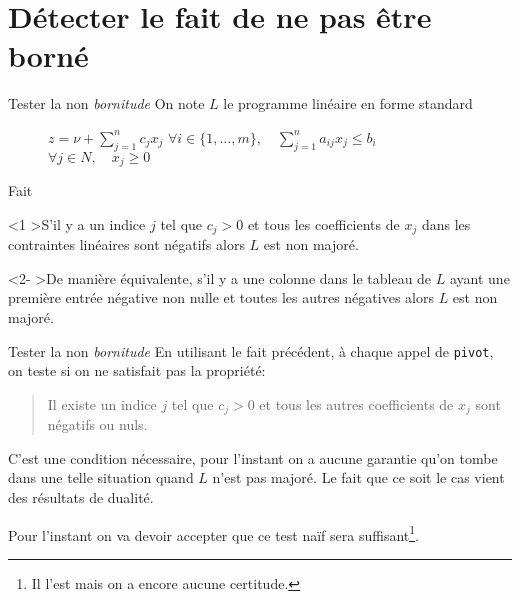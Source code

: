 \documentclass[aspectratio = 169]{beamer}
\begin{document}
\section{Détecter le fait de ne pas être borné}

\begin{frame}{Tester la non \emph{bornitude}}
  On note $L$ le programme linéaire en forme standard
  \begin{figure}
    \begin{linearProgG}{
        ${\displaystyle z = \nu + \sum_{j=1}^n c_jx_j}$
      }{
        ${\displaystyle \forall i \in \{1, \ldots, m\}, \quad \sum_{j=1}^n a_{ij}x_j \leq b_i}$
      }{
        $\forall j \in N, \quad x_j \geq 0$
      }
    \end{linearProgG}
  \end{figure}
  \begin{halfshyblock}{Fait}
    \begin{onlyenv}<1
      >S'il y a un indice $j$ tel que $c_j > 0$ et
      tous les coefficients de $x_j$ dans les contraintes linéaires
      sont négatifs alors $L$ est non majoré.
    \end{onlyenv}
    \begin{onlyenv}<2-
      >\!\alert{De manière équivalente, s'il y a une
        colonne dans le tableau de $L$ ayant une première entrée
        négative non nulle et toutes les autres négatives alors $L$
        est non majoré.}
    \end{onlyenv}
    \end{halfshyblock}
\end{frame}

\begin{frame}{Tester la non \emph{bornitude}}
  En utilisant le fait précédent, à chaque appel de
  \texttt{pivot}, on teste si on ne satisfait pas la
  propriété:
  \begin{quote}
    Il existe un indice $j$ tel que $c_j > 0$ et tous les autres
    coefficients de $x_j$ sont négatifs ou nuls.
    \end{quote}
    \pause
    C'est une condition nécessaire, pour l'instant on a aucune
    garantie qu'on tombe dans une telle situation quand $L$ n'est pas
    majoré. Le fait que ce soit le cas vient des résultats de dualité.

    \pause Pour l'instant on va devoir accepter que ce test naïf sera
    suffisant\footnote{Il l'est mais on a encore aucune certitude.}.
\end{frame}
\end{document}
